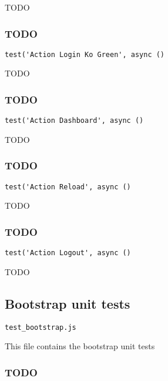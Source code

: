 \documentclass[a4paper]{article}
\begin{document}
TODO

\hypertarget{toc467}{}
\subsubsection{TODO}

\begin{lstlisting}
test('Action Login Ko Green', async ()
\end{lstlisting}

TODO

\hypertarget{toc468}{}
\subsubsection{TODO}

\begin{lstlisting}
test('Action Dashboard', async ()
\end{lstlisting}

TODO

\hypertarget{toc469}{}
\subsubsection{TODO}

\begin{lstlisting}
test('Action Reload', async ()
\end{lstlisting}

TODO

\hypertarget{toc470}{}
\subsubsection{TODO}

\begin{lstlisting}
test('Action Logout', async ()
\end{lstlisting}

TODO

\hypertarget{toc471}{}
\subsection{Bootstrap unit tests}

\begin{lstlisting}
test_bootstrap.js
\end{lstlisting}

This file contains the bootstrap unit tests

\hypertarget{toc472}{}
\subsubsection{TODO}
\end{document}

